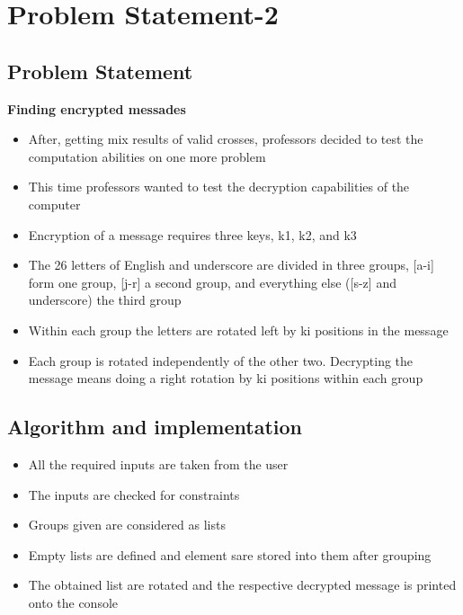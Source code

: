 \documentclass[10pt]{article}
\begin{document}
\newpage





\section{\textbf{\large Problem Statement-2}}
\subsection{Problem Statement}
\textbf{Finding encrypted messades }
\begin{itemize}
		\item After, getting mix results of valid crosses, professors decided to test the computation abilities on one more problem
		\item This time professors wanted to test the decryption capabilities of the computer
		\item Encryption of  a message requires three keys, k1, k2, and k3
		\item The 26 letters of English and underscore are divided in three groups,  [a-i] form one group, [j-r] a second group, and everything else ([s-z] and underscore) the third group
		\item Within each group the letters are rotated left by ki positions in the message
		\item Each group is rotated independently of the other two. Decrypting the message means doing a right rotation by ki positions within each group	
\end{itemize}

\subsection{Algorithm and implementation}
\begin{itemize}
		\item All the required inputs are taken from the user
		\item The inputs are checked for constraints
		\item Groups given are considered as lists
		\item Empty lists are defined and element sare stored into them after grouping
		\item \cite{3}The obtained list are rotated and the respective decrypted message is printed onto the console
\end{itemize}

\newpage
\end{document}
